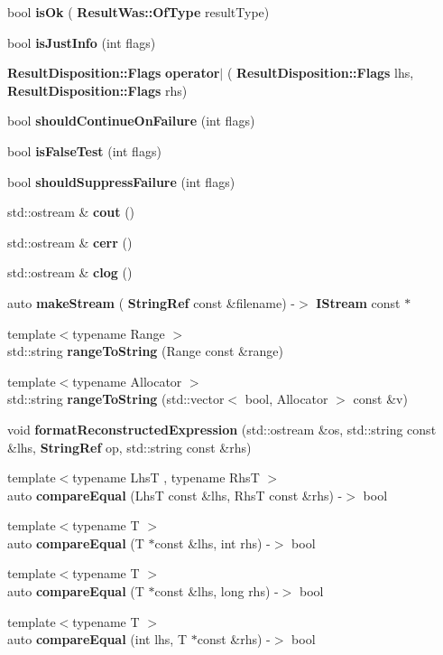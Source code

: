 \begin{DoxyCompactItemize}
\item 
bool \textbf{ is\+Ok} (\textbf{ Result\+Was\+::\+Of\+Type} result\+Type)
\item 
bool \textbf{ is\+Just\+Info} (int flags)
\item 
\textbf{ Result\+Disposition\+::\+Flags} \textbf{ operator$\vert$} (\textbf{ Result\+Disposition\+::\+Flags} lhs, \textbf{ Result\+Disposition\+::\+Flags} rhs)
\item 
bool \textbf{ should\+Continue\+On\+Failure} (int flags)
\item 
bool \textbf{ is\+False\+Test} (int flags)
\item 
bool \textbf{ should\+Suppress\+Failure} (int flags)
\item 
std\+::ostream \& \textbf{ cout} ()
\item 
std\+::ostream \& \textbf{ cerr} ()
\item 
std\+::ostream \& \textbf{ clog} ()
\item 
auto \textbf{ make\+Stream} (\textbf{ String\+Ref} const \&filename) -\/$>$ \textbf{ I\+Stream} const $\ast$
\item 
{\footnotesize template$<$typename Range $>$ }\\std\+::string \textbf{ range\+To\+String} (Range const \&range)
\item 
{\footnotesize template$<$typename Allocator $>$ }\\std\+::string \textbf{ range\+To\+String} (std\+::vector$<$ bool, Allocator $>$ const \&v)
\item 
void \textbf{ format\+Reconstructed\+Expression} (std\+::ostream \&os, std\+::string const \&lhs, \textbf{ String\+Ref} op, std\+::string const \&rhs)
\item 
{\footnotesize template$<$typename LhsT , typename RhsT $>$ }\\auto \textbf{ compare\+Equal} (LhsT const \&lhs, RhsT const \&rhs) -\/$>$ bool
\item 
{\footnotesize template$<$typename T $>$ }\\auto \textbf{ compare\+Equal} (T $\ast$const \&lhs, int rhs) -\/$>$ bool
\item 
{\footnotesize template$<$typename T $>$ }\\auto \textbf{ compare\+Equal} (T $\ast$const \&lhs, long rhs) -\/$>$ bool
\item 
{\footnotesize template$<$typename T $>$ }\\auto \textbf{ compare\+Equal} (int lhs, T $\ast$const \&rhs) -\/$>$ bool
\item 

\end{DoxyCompactItemize}
